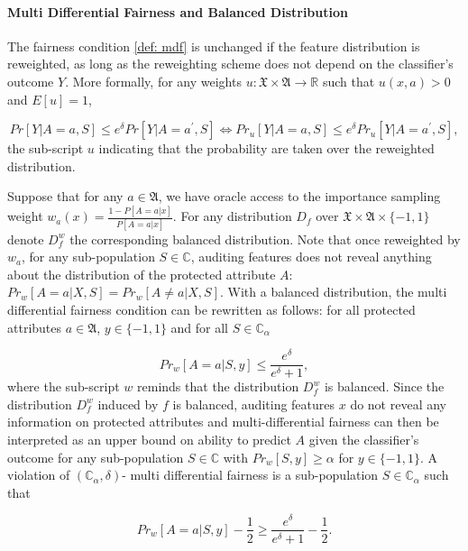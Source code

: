 \documentclass{article}
\begin{document}
\paragraph{Multi Differential Fairness and Balanced Distribution}
The fairness condition \ref{def: mdf} is unchanged if the feature distribution is reweighted, as long as the reweighting scheme does not depend on the classifier's outcome $Y$. More formally, for any weights $u: \mathfrak{X}\times \mathfrak{A} \rightarrow \mathbb{R}$ such that $u(x,a)> 0$ and $E[u]=1$, 

\begin{equation}
Pr[Y|A=a, S] \leq e^{\delta} Pr[Y|A=a^{'}, S] \iff Pr_{u}[Y|A=a, S] \leq e^{\delta} Pr_{u}[Y|A=a^{'}, S],
\end{equation}
the sub-script $u$ indicating that the probability are taken over the reweighted distribution. 

\bigskip
Suppose that for any $a \in \mathfrak{A}$, we have oracle access to the importance sampling weight $w_{a}(x)=\frac{1 - P[A=a|x]}{P[A=a|x]}$. For any distribution $D_{f}$ over $\mathfrak{X} \times \mathfrak{A}\times \{-1, 1\}$ denote $D_{f}^{w}$ the corresponding balanced distribution. Note that once reweighted by $w_{a}$, for any sub-population $S\in \mathbb{C}$, auditing features does not reveal anything about the distribution of the protected attribute $A$: $Pr_{w}[A=a|X, S]=Pr_{w}[A\neq a|X, S]$. With a balanced distribution, the multi differential fairness condition can be rewritten as follows: for all protected attributes $a\in \mathfrak{A}$, $y\in \{-1,1\}$ and for all $S\in \mathbb{C}_{\alpha}$

\begin{equation}
    \label{eq: mdf_w}
    Pr_{w}[A=a |S, y] \leq \frac{e^{\delta}}{e^{\delta} + 1},
\end{equation}
where the sub-script $w$ reminds that the distribution $D_{f}^{w}$ is balanced. Since the distribution $D_{f}^{w}$ induced by $f$ is balanced, auditing features $x$ do not reveal any information on protected attributes and multi-differential fairness can then be interpreted as an upper bound on ability to predict $A$ given the classifier's outcome for any sub-population $S\in \mathbb{C}$ with $Pr_{w}[S, y] \geq \alpha$ for $y\in\{-1, 1\}$.  A violation of $(\mathbb{C}_{\alpha}, \delta)$- multi differential fairness is a sub-population $S\in \mathbb{C}_{\alpha}$ such that 

\begin{equation}
    \label{eq: mdf_viol1}
    Pr_{w}[A=a |S, y] - \frac{1}{2}\geq \frac{e^{\delta}}{e^{\delta} + 1} - \frac{1}{2}. 
\end{equation}
\end{document}
